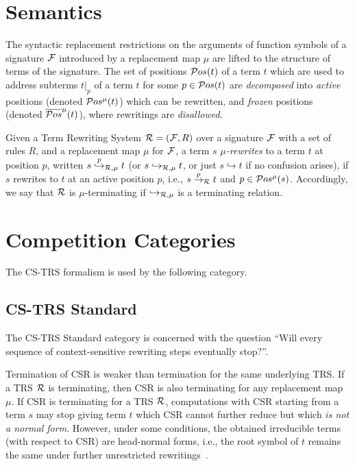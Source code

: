 \section{Semantics}

The syntactic replacement restrictions on the arguments of function symbols of a signature ${\cal F}$ introduced by a replacement map $\mu$ are lifted to the structure of terms of the signature. The set of positions ${\cal P}os(t)$ of a term $t$ which are used to address subterms $t|_p$ of a term $t$ for some $p\in{\cal P}os(t)$ are \emph{decomposed} into \emph{active} positions (denoted ${\cal P}os^\mu(t)$) which can be rewritten, and \emph{frozen} positions (denoted $\overline{{\cal P}os}^\mu(t)$), where rewritings are \emph{disallowed}.

Given a Term Rewriting System ${\cal R}=({\cal F},R)$ over a signature ${\cal F}$ with a set of rules $R$, and a replacement map $\mu$ for ${\cal F}$, a term $s$ \emph{$\mu$-rewrites} to a term $t$ at position $p$, written 
$s\stackrel{p}{\hookrightarrow}_{{\cal R},\mu} t$ (or $s\hookrightarrow_{{\cal R},\mu} t$, 
or just $s\hookrightarrow t$ if no confusion arises), if $s$ rewrites to $t$ at an active position $p$, i.e., $s\stackrel{p}{\to}_{\cal R}t$ and 
$p\in{\cal P}os^\mu(s)$.
%
Accordingly, we say that ${\cal R}$ is $\mu$-terminating if $\hookrightarrow_{{\cal R},\mu}$ is a terminating relation.

\section{Competition Categories}

The CS-TRS formalism is used by the following category.

\subsection{CS-TRS Standard}

The CS-TRS Standard category is concerned with the question ``Will every sequence of context-sensitive rewriting steps eventually stop?''. 

\begin{motivation}
Termination of CSR is weaker than termination for the same underlying TRS.
%
If a TRS ${\cal R}$ is terminating, then CSR is also terminating for any replacement map $\mu$.
%
If CSR is terminating for a TRS ${\cal R}$, computations with CSR starting from a term $s$ may stop giving term $t$ which CSR cannot further reduce but which \emph{is not a normal form}.
%
However, under some conditions, the obtained irreducible terms (with respect to CSR) are head-normal forms, i.e., the root symbol of $t$ remains the same under further unrestricted rewritings~\cite{lucas2002ContextSensitiveRewritingStrategies}.
\end{motivation}

